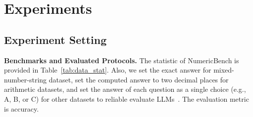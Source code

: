 \section{Experiments}

\subsection{Experiment Setting}

\noindent\textbf{Benchmarks and Evaluated Protocols.}
The statistic of  NumericBench is provided in Table~\ref{tab:data_stat}.
Also,
we set the exact answer for mixed-number-string dataset, 
set
the computed answer to two decimal places for arithmetic datasets, and  set the answer of each question as a single choice (e.g., A, B, or C) for other datasets to reliable evaluate LLMs~\citep{bai2024longbench}.
The evaluation metric is accuracy.

